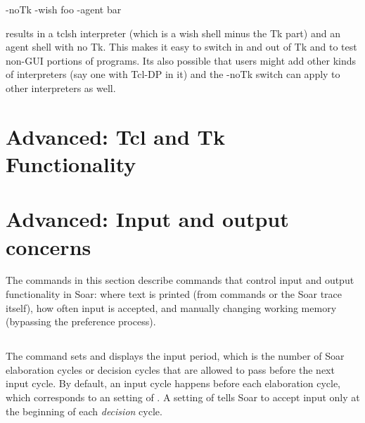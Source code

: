 {{	-noTk -wish foo -agent bar 

	results in a tclsh interpreter (which is a wish shell minus the Tk
	part) and an agent shell with no Tk.  This makes it easy to switch in
	and out of Tk and to test non-GUI portions of programs.  Its also
	possible that users might add other kinds of interpreters (say one
	with Tcl-DP in it) and the -noTk switch can apply to other
	interpreters as well.
	}


\section{Advanced: Tcl and Tk Functionality}
\label{INTERFACE-advanced-tcl}


\section{Advanced: Input and output concerns}
\label{INTERFACE-advanced-io}

The commands in this section describe commands that control input and output
functionality in Soar: where text is printed (from commands or the Soar trace
itself), how often input is accepted, and manually changing working memory
(bypassing the preference process). 


\subsection{ \soar{[n]}}
\label{input-period}



The  command sets and displays the input period, which is
the number of Soar elaboration cycles or decision cycles that are allowed to
pass before the next input cycle. By default, an input cycle happens before
each elaboration cycle, which corresponds to an  setting of
. A setting of  tells Soar to accept input only at the
beginning of each \emph{decision} cycle.

}

